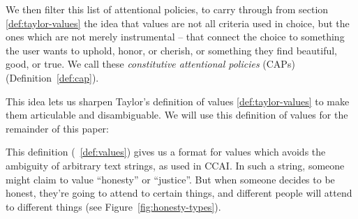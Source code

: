 \documentclass{article}
\theoremstyle{definition}
\newtheorem{definition}{Definition}[section]
\begin{document}

We then filter this list of attentional policies, to carry through from section \ref{def:taylor-values} the idea that values are not all criteria used in choice, but the ones which are not merely instrumental -- that connect the choice to something the user wants to uphold, honor, or cherish, or something they find beautiful, good, or true. We call these \textit{constitutive attentional policies} (CAPs) (Definition~\ref{def:cap}).


This idea lets us sharpen Taylor's definition of values \ref{def:taylor-values} to make them articulable and disambiguable. We will use this definition of values for the remainder of this paper:


This definition (~\ref{def:values}) gives us a format for values which avoids the ambiguity of arbitrary text strings, as used in CCAI. In such a string, someone might claim to value “honesty” or “justice”. But when someone decides to be honest, they're going to attend to certain things, and different people will attend to different things (see Figure~\ref{fig:honesty-types}).
\end{document}
